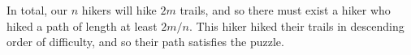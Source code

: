 \documentclass{theoretics}
\begin{document}
\begin{solution}
\begin{center}
\begin{minipage}{.3\textwidth}
\end{minipage}
\end{center}

In total, our $n$ hikers will hike $2m$ trails, and so there must exist a hiker who hiked a path of length at least $2m/n$.
This hiker hiked their trails in descending order of difficulty, and so their path satisfies the puzzle.
\end{solution}









\end{document}
